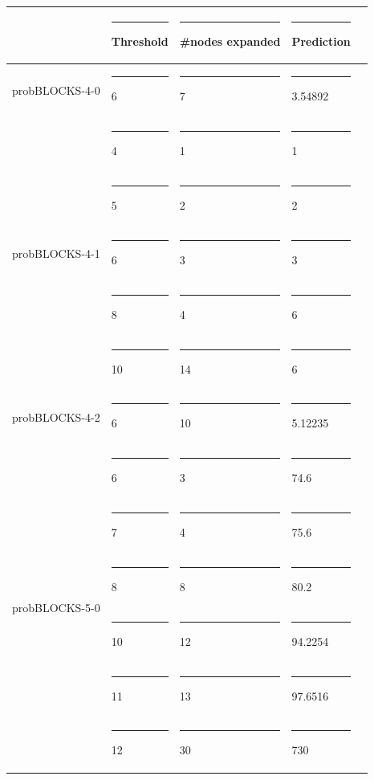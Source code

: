 \documentclass[11pt,a4paper,oneside]{report}
\begin{document}
\footnotesize  %
\setlength\LTleft{100pt}            %
\setlength\LTright{200pt}           %
\begin{longtable}{@{\extracolsep{\fill}} lllll @{}}
\hline
                                &\rule{4pt}{0ex} Threshold &\rule{4pt}{0ex} \#nodes expanded &\rule{4pt}{0ex} Prediction \\ \hline
probBLOCKS-4-0                  &\rule{4pt}{0ex} 6         &\rule{4pt}{0ex} 7                &\rule{4pt}{0ex} 3.54892    \\ \hline
\multirow{5}{*}{probBLOCKS-4-1} &\rule{4pt}{0ex} 4         &\rule{4pt}{0ex} 1                &\rule{4pt}{0ex} 1          \\ \cline{2-4} 
                                &\rule{4pt}{0ex} 5         &\rule{4pt}{0ex} 2                &\rule{4pt}{0ex} 2          \\ \cline{2-4} 
                                &\rule{4pt}{0ex} 6         &\rule{4pt}{0ex} 3                &\rule{4pt}{0ex} 3          \\ \cline{2-4}
                                &\rule{4pt}{0ex} 8         &\rule{4pt}{0ex} 4                &\rule{4pt}{0ex} 6          \\ \cline{2-4}
                                &\rule{4pt}{0ex} 10        &\rule{4pt}{0ex} 14               &\rule{4pt}{0ex} 6          \\ \hline
probBLOCKS-4-2                  &\rule{4pt}{0ex} 6         &\rule{4pt}{0ex} 10               &\rule{4pt}{0ex} 5.12235    \\ \hline
\multirow{6}{*}{probBLOCKS-5-0} &\rule{4pt}{0ex} 6         &\rule{4pt}{0ex} 3                &\rule{4pt}{0ex} 74.6       \\ \cline{2-4}
							   &\rule{4pt}{0ex} 7         &\rule{4pt}{0ex} 4                &\rule{4pt}{0ex} 75.6        \\ \cline{2-4}
							   &\rule{4pt}{0ex} 8         &\rule{4pt}{0ex} 8                &\rule{4pt}{0ex} 80.2        \\ \cline{2-4}
							   &\rule{4pt}{0ex} 10        &\rule{4pt}{0ex} 12               &\rule{4pt}{0ex} 94.2254     \\ \cline{2-4}
							   &\rule{4pt}{0ex} 11        &\rule{4pt}{0ex} 13               &\rule{4pt}{0ex} 97.6516     \\ \cline{2-4}
							   &\rule{4pt}{0ex} 12        &\rule{4pt}{0ex} 30               &\rule{4pt}{0ex} 730         \\ \hline

\end{longtable}
\end{document}

